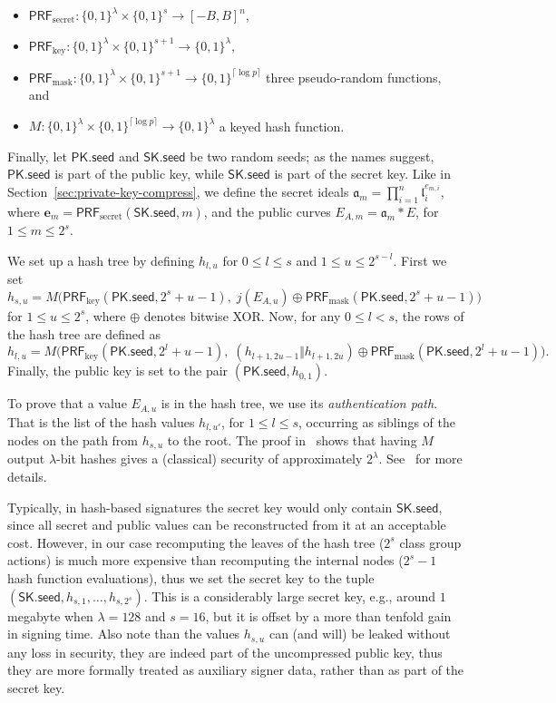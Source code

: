 \documentclass{llncs}
\newcommand{\seed}{\textsf{seed}}
\newcommand{\PK}{\textsf{PK}}
\newcommand{\SK}{\textsf{SK}}
\renewcommand{\a}{\mathfrak{a}}
\renewcommand{\l}{\mathfrak{l}}
\newcommand{\e}{\textbf{e}}
\newcommand{\PRF}{\textsf{PRF}}
\newcommand{\PRFk}{\PRF_{\mathrm{key}}}
\newcommand{\PRFm}{\PRF_{\mathrm{mask}}}
\newcommand{\PRFs}{\PRF_{\mathrm{secret}}}
\begin{document}
\begin{itemize}
\item $\PRFs: \{0,1\}^\lambda \times \{0,1\}^s \to [-B,B]^n$,
\item $\PRFk: \{0,1\}^\lambda \times \{0,1\}^{s+1} \to \{0,1\}^\lambda$,
\item $\PRFm: \{0,1\}^\lambda \times \{0,1\}^{s+1} \to \{0,1\}^{\lceil\log p\rceil}$ three pseudo-random functions, and
\item $M: \{0,1\}^\lambda \times \{0,1\}^{\lceil\log p\rceil} \to \{0,1\}^\lambda$ a keyed hash function.
\end{itemize}

Finally, let $\PK.\seed$ and $\SK.\seed$ be two random seeds; as the names suggest, $\PK.\seed$ is part of the public key, while $\SK.\seed$ is part of the secret key.
Like in Section~\ref{sec:private-key-compress}, we define the secret ideals $\a_m = \prod_{i=1}^n \l_i^{e_{m,i}}$, where $\e_m=\PRFs(\SK.\seed, m)$, and the public curves $E_{A,m}=\a_m*E$, for $1\le m\le 2^s$.

We set up a hash tree by defining $h_{l,u}$ for $0 \le l \le s$ and $1 \le u \le 2^{s-l}$.
First we set
\[h_{s,u} = M\bigl( \PRFk(\PK.\seed,2^s+u-1),\; j( E_{A,u} ) \oplus \PRFm(\PK.\seed,2^s+u-1) \bigr)\]
for $1 \le u \le 2^s$, where $\oplus$ denotes bitwise XOR.
Now, for any $0 \le l < s$, the rows of the hash tree are defined as
\[
  h_{l,u} = M\bigl( \PRFk(\PK.\seed, 2^l+u-1),\;
  (h_{l+1,2u-1}\Vert h_{l+1,2u}) \oplus \PRFm(\PK.\seed, 2^l+u-1) \bigr).
\]
Finally, the public key is set to the pair $(\PK.\seed, h_{0,1})$.

To prove that a value $E_{A,u}$ is in the hash tree, we use its \emph{authentication path}.
That is the list of the hash values $h_{l,u'}$, for $1\le l \le s$, occurring as siblings of the nodes on the path from $h_{s,u}$ to the root.
The proof in~\cite[Appendix~B]{10.1007/978-3-662-49384-7_15} shows that having $M$ output $\lambda$-bit hashes gives a (classical) security of approximately $2^\lambda$.
See~\cite{10.1007/978-3-662-49384-7_15,sphincs+} for more details.

Typically, in hash-based signatures the secret key would only contain $\SK.\seed$, since all secret and public values can be reconstructed from it at an acceptable cost.
However, in our case recomputing the leaves of the hash tree ($2^s$ class group actions) is much more expensive than recomputing the internal nodes ($2^s-1$ hash function evaluations), thus we set the secret key to the tuple $(\SK.\seed,h_{s,1},\dots,h_{s,2^s})$.
This is a considerably large secret key, e.g., around $1$ megabyte when $\lambda=128$ and $s=16$, but it is offset by a more than tenfold gain in signing time.
Also note than the values $h_{s,u}$ can (and will) be leaked without any loss in security, they are indeed part of the uncompressed public key, thus they are more formally treated as auxiliary signer data, rather than as part of the secret key.
\end{document}
